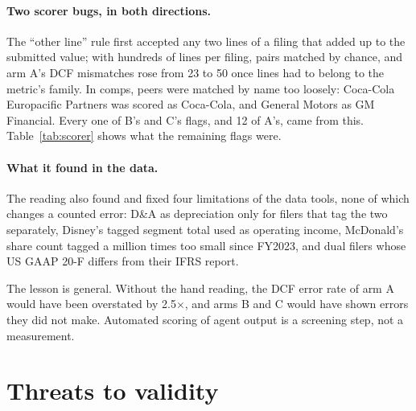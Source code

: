 \documentclass[10pt,a4paper]{article}
\begin{document}
\paragraph{Two scorer bugs, in both directions.} The ``other line'' rule first accepted any two lines of a filing
that added up to the submitted value; with hundreds of lines per filing, pairs matched by chance, and arm A's DCF
mismatches rose from 23 to 50 once lines had to belong to the metric's family. In comps, peers were matched by name
too loosely: Coca-Cola Europacific Partners was scored as Coca-Cola, and General Motors as GM Financial. Every one of
B's and C's flags, and 12 of A's, came from this. Table~\ref{tab:scorer} shows what the remaining flags were.

\paragraph{What it found in the data.} The reading also found and fixed four limitations of the data tools, none of
which changes a counted error: D\&A as depreciation only for filers that tag the two separately, Disney's tagged
segment total used as operating income, McDonald's share count tagged a million times too small since FY2023, and dual
filers whose US GAAP 20-F differs from their IFRS report.

The lesson is general. Without the hand reading, the DCF error rate of arm A would have been overstated by
2.5$\times$, and arms B and C would have shown errors they did not make. Automated scoring of agent output is a
screening step, not a measurement.

\section{Threats to validity}
\end{document}
